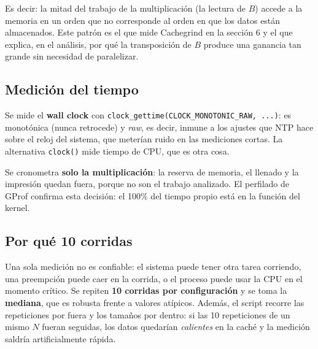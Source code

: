 Es decir: la mitad del trabajo de la multiplicación (la lectura de $B$) accede a la memoria en un orden que no corresponde al orden en que los datos están almacenados. Este patrón es el que mide Cachegrind en la sección 6 y el que explica, en el análisis, por qué la transposición de $B$ produce una ganancia tan grande sin necesidad de paralelizar.

\subsection{Medición del tiempo}

Se mide el \textbf{wall clock} con \texttt{clock\_gettime(CLOCK\_MONOTONIC\_RAW, ...)}: es monotónica (nunca retrocede) y \emph{raw}, es decir, inmune a los ajustes que NTP hace sobre el reloj del sistema, que meterían ruido en las mediciones cortas. La alternativa \texttt{clock()} mide tiempo de CPU, que es otra cosa.

Se cronometra \textbf{solo la multiplicación}: la reserva de memoria, el llenado y la impresión quedan fuera, porque no son el trabajo analizado. El perfilado de GProf confirma esta decisión: el 100\% del tiempo propio está en la función del kernel.

\subsection{Por qué 10 corridas}

Una sola medición no es confiable: el sistema puede tener otra tarea corriendo, una preempción puede caer en la corrida, o el proceso puede usar la CPU en el momento crítico. Se repiten \textbf{10 corridas por configuración} y se toma la \textbf{mediana}, que es robusta frente a valores atípicos. Además, el script recorre las repeticiones por fuera y los tamaños por dentro: si las 10 repeticiones de un mismo $N$ fueran seguidas, los datos quedarían \emph{calientes} en la caché y la medición saldría artificialmente rápida.
